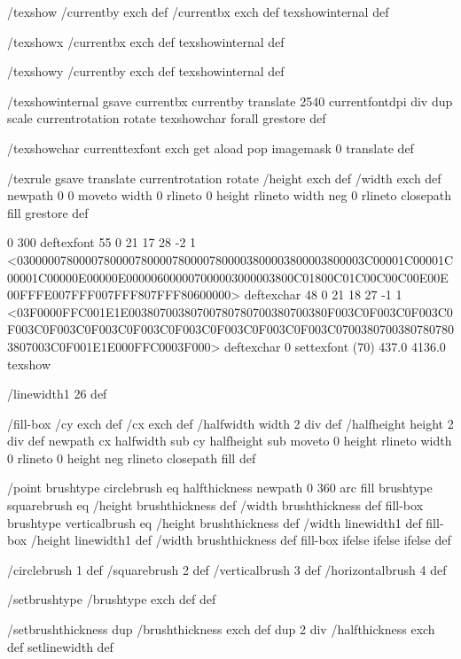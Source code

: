 /texshow
 { /currentby exch def
   /currentbx exch def
   texshowinternal } def

/texshowx
 { /currentbx exch def
   texshowinternal } def

/texshowy
 { /currentby exch def
   texshowinternal } def

/texshowinternal
 { gsave
   currentbx currentby translate
   2540 currentfontdpi div dup scale
   currentrotation rotate
   {texshowchar} forall
   grestore } def

/texshowchar
   { currenttexfont exch get aload pop imagemask 0 translate } def

/texrule
 { gsave
   translate
   currentrotation rotate
   /height exch def
   /width exch def
   newpath
    0 0 moveto
    width 0 rlineto
    0 height rlineto
    width neg 0 rlineto
    closepath
    fill
   grestore } def

0 300 deftexfont
55 0 21 17 28 -2 1 {{<03000007800007800007800007800007800003800003800003800003C00001C00001C00001C00000E00000E000006000007000003000003800C01800C01C00C00C00E00E00FFFE007FFF007FFF807FFF80600000>}} deftexchar
48 0 21 18 27 -1 1 {{<03F0000FFC001E1E00380700380700780780700380700380F003C0F003C0F003C0F003C0F003C0F003C0F003C0F003C0F003C0F003C0F003C07003807003807807803807003C0F001E1E000FFC0003F000>}} deftexchar
0 settexfont
(70) 437.0 4136.0 texshow



/linewidth1 26 def

/fill-box
  { /cy exch def /cx exch def
    /halfwidth width 2 div def
    /halfheight height 2 div def
    newpath
     cx halfwidth sub cy halfheight sub moveto
     0 height rlineto
     width 0 rlineto
     0 height neg rlineto
     closepath
     fill } def

/point
  { brushtype circlebrush eq
     { halfthickness newpath 0 360 arc fill }
     { brushtype squarebrush eq
        { /height brushthickness def
	  /width brushthickness def
	  fill-box }
        { brushtype verticalbrush eq
           { /height brushthickness def
	     /width linewidth1 def
	     fill-box }
           { /height linewidth1 def
	     /width brushthickness def
	     fill-box }
	   ifelse }
        ifelse }
     ifelse } def

/circlebrush     1 def
/squarebrush     2 def
/verticalbrush   3 def
/horizontalbrush 4 def

/setbrushtype { /brushtype exch def } def

/setbrushthickness
  { dup /brushthickness exch def
    dup 2 div /halfthickness exch def
    setlinewidth } def

